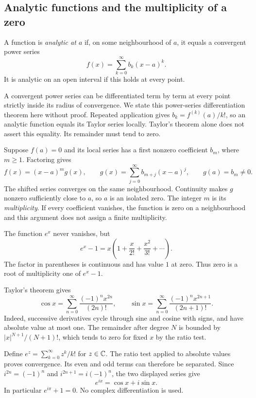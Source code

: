 \subsection{Analytic functions and the multiplicity of a zero}
\label{sec:analysis-i:analytic-functions}

\begin{definition}
  \label{thm:analysis-i:analytic-function}
  A function is \emph{analytic at $a$} if, on some neighbourhood of $a$,
  it equals a convergent power series
  \[
    f(x)=\sum_{k=0}^{\infty}b_k(x-a)^k.
  \]
  It is analytic on an open interval if this holds at every point.
\end{definition}
A convergent power series can be differentiated term by term at every
point strictly inside its radius of convergence. We state this
power-series differentiation theorem here without proof. Repeated
application gives $b_k=f^{(k)}(a)/k!$, so an analytic function equals
its Taylor series locally. Taylor's theorem alone does not assert this
equality. Its remainder must tend to zero.

Suppose $f(a)=0$ and its local series has a first nonzero coefficient
$b_m$, where $m\ge1$. Factoring gives
\[
  f(x)=(x-a)^m g(x),\qquad
  g(x)=\sum_{j=0}^{\infty}b_{m+j}(x-a)^j,\qquad g(a)=b_m\ne0.
\]
The shifted series converges on the same neighbourhood. Continuity
makes $g$ nonzero sufficiently close to $a$, so $a$ is an isolated zero.
The integer $m$ is its \emph{multiplicity}. If every coefficient
vanishes, the function is zero on a neighbourhood and this argument
does not assign a finite multiplicity.

\begin{example}
  The function $e^x$ never vanishes, but
  \[
    e^x-1=x\left(1+\frac{x}{2!}+\frac{x^2}{3!}+\cdots\right).
  \]
  The factor in parentheses is continuous and has value $1$ at zero.
  Thus zero is a root of multiplicity one of $e^x-1$.
\end{example}

\begin{example}
  Taylor's theorem gives
  \[
    \cos x=\sum_{n=0}^{\infty}\frac{(-1)^n x^{2n}}{(2n)!},\qquad
    \sin x=\sum_{n=0}^{\infty}\frac{(-1)^n x^{2n+1}}{(2n+1)!}.
  \]
  Indeed, successive derivatives cycle through sine and cosine with
  signs, and have absolute value at most one. The remainder after
  degree $N$ is bounded by $|x|^{N+1}/(N+1)!$, which tends to zero
  for fixed $x$ by the ratio test.

  Define $e^z=\sum_{k=0}^{\infty}z^k/k!$ for $z\in\mathbb{C}$.
  The ratio test applied to absolute values proves convergence.
  Its even and odd terms can therefore be separated. Since
  $i^{2n}=(-1)^n$ and $i^{2n+1}=i(-1)^n$, the two displayed series give
  \[
    e^{ix}=\cos x+i\sin x.
  \]
  In particular $e^{i\pi}+1=0$. No complex differentiation is used.
\end{example}


